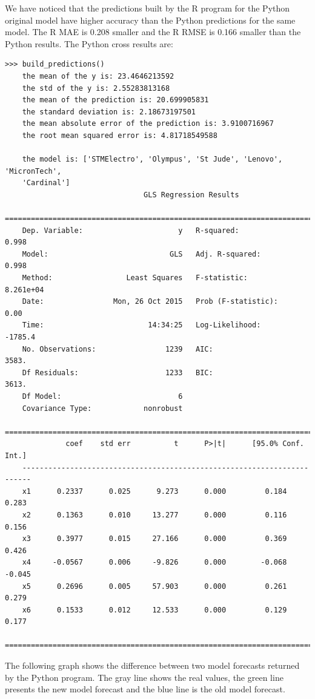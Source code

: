 \documentclass[
  twoside,
  11pt, a4paper,
  footinclude=true,
  headinclude=true,
  cleardoublepage=empty
]{scrreprt}
\begin{document}
    We have noticed that the predictions built by the R program for the Python original model have higher accuracy than the Python predictions for the same model. The R MAE is 0.208 smaller and the R RMSE is 0.166 smaller than the Python results.
    The Python cross results are:
    \begin{lstlisting}[basicstyle=\footnotesize]
    >>> build_predictions()
    the mean of the y is: 23.4646213592
    the std of the y is: 2.55283813168
    the mean of the prediction is: 20.699905831
    the standard deviation is: 2.18673197501
    the mean absolute error of the prediction is: 3.9100716967
    the root mean squared error is: 4.81718549588
    
    the model is: ['STMElectro', 'Olympus', 'St Jude', 'Lenovo', 'MicronTech',
    'Cardinal']
                                GLS Regression Results                            
    ========================================================================
    Dep. Variable:                      y   R-squared:                 0.998
    Model:                            GLS   Adj. R-squared:            0.998
    Method:                 Least Squares   F-statistic:           8.261e+04
    Date:                Mon, 26 Oct 2015   Prob (F-statistic):         0.00
    Time:                        14:34:25   Log-Likelihood:          -1785.4
    No. Observations:                1239   AIC:                        3583.
    Df Residuals:                    1233   BIC:                        3613.
    Df Model:                           6                                         
    Covariance Type:            nonrobust                                         
    ========================================================================
              coef    std err          t      P>|t|      [95.0% Conf. Int.]
    ------------------------------------------------------------------------
    x1      0.2337      0.025      9.273      0.000         0.184     0.283
    x2      0.1363      0.010     13.277      0.000         0.116     0.156
    x3      0.3977      0.015     27.166      0.000         0.369     0.426
    x4     -0.0567      0.006     -9.826      0.000        -0.068    -0.045
    x5      0.2696      0.005     57.903      0.000         0.261     0.279
    x6      0.1533      0.012     12.533      0.000         0.129     0.177
    ========================================================================
    \end{lstlisting}
    The following graph shows the difference between two model forecasts returned by the Python program. The gray line shows the real values, the green line presents the new model forecast and the blue line is the old model forecast.
    
\end{document}
